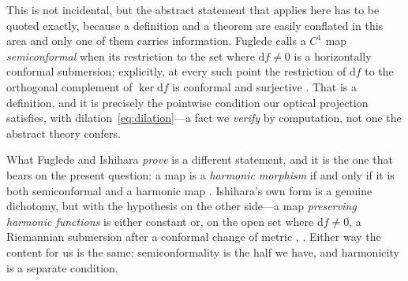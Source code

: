 \documentclass[12pt]{iopart}
\theoremstyle{plain}
\theoremstyle{definition}
\theoremstyle{remark}
\newcommand{\dd}{\mathrm{d}}
\begin{document}
This is not incidental, but the abstract statement that applies here has to be
quoted exactly, because a definition and a theorem are easily conflated in this
area and only one of them carries information. Fuglede calls a $C^1$ map
\emph{semiconformal} when its restriction to the set where $\dd f\neq0$ is a
horizontally conformal submersion; explicitly, at every such point the restriction
of $\dd f$ to the orthogonal complement of $\ker\dd f$ is conformal and surjective
\cite[\S5]{Fuglede1978}. That is a definition, and it is precisely the pointwise
condition our optical projection satisfies, with dilation~\eqref{eq:dilation}---a
fact we \emph{verify} by computation, not one the abstract theory confers.

What Fuglede and Ishihara \emph{prove} is a different statement, and it is the one
that bears on the present question: a map is a \emph{harmonic morphism} if and only
if it is both semiconformal and a harmonic map \cite[\S7]{Fuglede1978}. Ishihara's
own form is a genuine dichotomy, but with the hypothesis on the other side---a map
\emph{preserving harmonic functions} is either constant or, on the open set where
$\dd f\neq0$, a Riemannian submersion after a conformal change of metric
\cite[Thm.~5.1]{Ishihara1979}, \cite{BairdWood2003}. Either way the content for us
is the same: semiconformality is the half we have, and harmonicity is a separate
condition.
\end{document}
